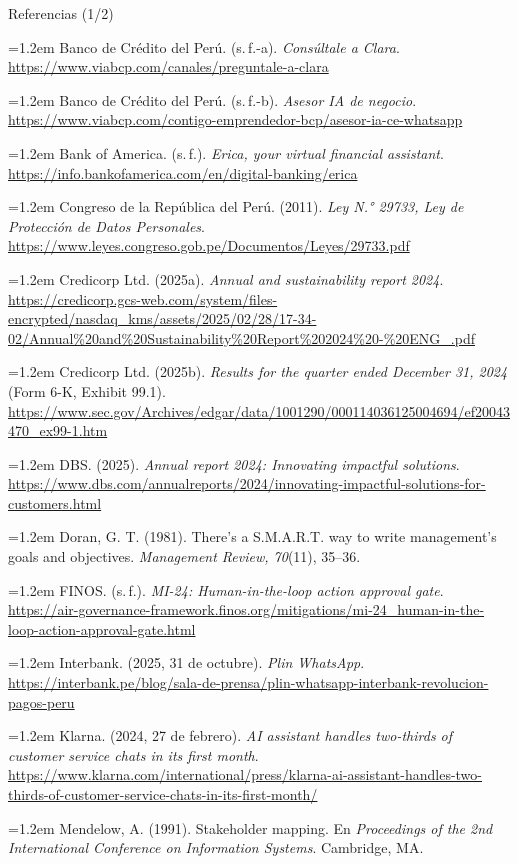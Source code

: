 \documentclass[aspectratio=169,11pt]{beamer}
\begin{document}
\begin{frame}{Referencias (1/2)}
\vspace{-0.05cm}
\tiny
\setlength{\parskip}{0.35em}
\raggedright
\hangindent=1.2em Banco de Crédito del Perú. (s.\,f.-a). \textit{Consúltale a Clara}. \url{https://www.viabcp.com/canales/preguntale-a-clara}\par
\hangindent=1.2em Banco de Crédito del Perú. (s.\,f.-b). \textit{Asesor IA de negocio}. \url{https://www.viabcp.com/contigo-emprendedor-bcp/asesor-ia-ce-whatsapp}\par
\hangindent=1.2em Bank of America. (s.\,f.). \textit{Erica, your virtual financial assistant}. \url{https://info.bankofamerica.com/en/digital-banking/erica}\par
\hangindent=1.2em Congreso de la República del Perú. (2011). \textit{Ley N.° 29733, Ley de Protección de Datos Personales}. \url{https://www.leyes.congreso.gob.pe/Documentos/Leyes/29733.pdf}\par
\hangindent=1.2em Credicorp Ltd. (2025a). \textit{Annual and sustainability report 2024}. \url{https://credicorp.gcs-web.com/system/files-encrypted/nasdaq_kms/assets/2025/02/28/17-34-02/Annual\%20and\%20Sustainability\%20Report\%202024\%20-\%20ENG_.pdf}\par
\hangindent=1.2em Credicorp Ltd. (2025b). \textit{Results for the quarter ended December 31, 2024} (Form 6-K, Exhibit 99.1). \url{https://www.sec.gov/Archives/edgar/data/1001290/000114036125004694/ef20043470_ex99-1.htm}\par
\hangindent=1.2em DBS. (2025). \textit{Annual report 2024: Innovating impactful solutions}. \url{https://www.dbs.com/annualreports/2024/innovating-impactful-solutions-for-customers.html}\par
\hangindent=1.2em Doran, G. T. (1981). There's a S.M.A.R.T. way to write management's goals and objectives. \textit{Management Review, 70}(11), 35--36.\par
\hangindent=1.2em FINOS. (s.\,f.). \textit{MI-24: Human-in-the-loop action approval gate}. \url{https://air-governance-framework.finos.org/mitigations/mi-24_human-in-the-loop-action-approval-gate.html}\par
\hangindent=1.2em Interbank. (2025, 31 de octubre). \textit{Plin WhatsApp}. \url{https://interbank.pe/blog/sala-de-prensa/plin-whatsapp-interbank-revolucion-pagos-peru}\par
\hangindent=1.2em Klarna. (2024, 27 de febrero). \textit{AI assistant handles two-thirds of customer service chats in its first month}. \url{https://www.klarna.com/international/press/klarna-ai-assistant-handles-two-thirds-of-customer-service-chats-in-its-first-month/}\par
\hangindent=1.2em Mendelow, A. (1991). Stakeholder mapping. En \textit{Proceedings of the 2nd International Conference on Information Systems}. Cambridge, MA.\par
\end{frame}
\end{document}
